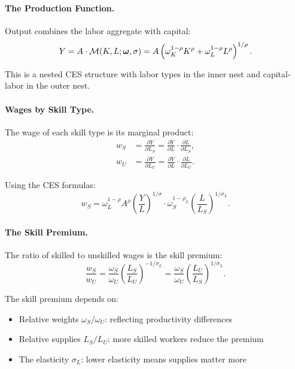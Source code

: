 \paragraph{The Production Function.}
Output combines the labor aggregate with capital:
\begin{equation}
Y = A \cdot \mathcal{M}(K, L; \boldsymbol{\omega}, \sigma) = A \left( \omega_K^{1-\rho} K^\rho + \omega_L^{1-\rho} L^\rho \right)^{1/\rho}.
\label{eq:production-hetero-labor}
\end{equation}

This is a nested CES structure with labor types in the inner nest and capital-labor in the outer nest.

\paragraph{Wages by Skill Type.}
The wage of each skill type is its marginal product:
\begin{align}
w_S &= \frac{\partial Y}{\partial L_S} = \frac{\partial Y}{\partial L} \cdot \frac{\partial L}{\partial L_S}, \label{eq:wage-skilled} \\[6pt]
w_U &= \frac{\partial Y}{\partial L_U} = \frac{\partial Y}{\partial L} \cdot \frac{\partial L}{\partial L_U}. \label{eq:wage-unskilled}
\end{align}

Using the CES formulas:
\begin{equation}
w_S = \omega_L^{1-\rho} A^\rho \left( \frac{Y}{L} \right)^{1/\sigma} \cdot \omega_S^{1-\rho_L} \left( \frac{L}{L_S} \right)^{1/\sigma_L}.
\label{eq:wage-skilled-full}
\end{equation}

\paragraph{The Skill Premium.}
The ratio of skilled to unskilled wages is the skill premium:
\begin{equation}
\frac{w_S}{w_U} = \frac{\omega_S}{\omega_U} \left( \frac{L_S}{L_U} \right)^{-1/\sigma_L} = \frac{\omega_S}{\omega_U} \left( \frac{L_U}{L_S} \right)^{1/\sigma_L}.
\label{eq:skill-premium}
\end{equation}

The skill premium depends on:
\begin{itemize}[nosep]
\item Relative weights $\omega_S/\omega_U$: reflecting productivity differences
\item Relative supplies $L_S/L_U$: more skilled workers reduce the premium
\item The elasticity $\sigma_L$: lower elasticity means supplies matter more
\end{itemize}

